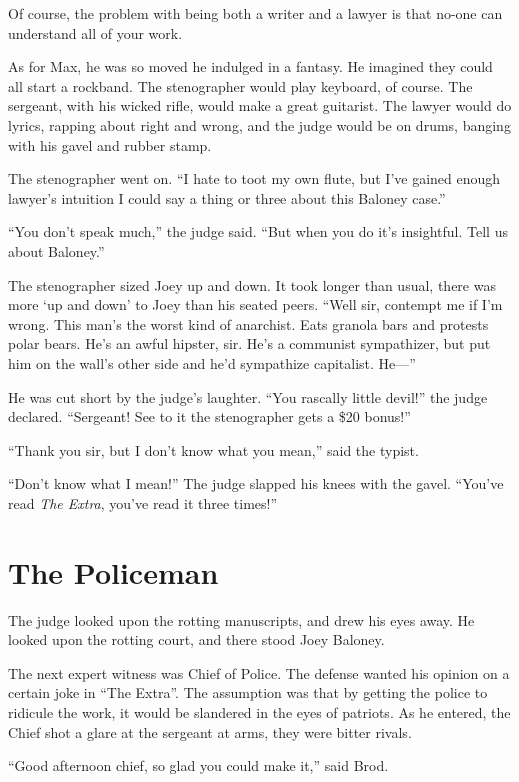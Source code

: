 \documentclass[oneside]{book}
\begin{document}
Of course, the problem with being both a writer and a lawyer is that no-one can
understand all of your work.

As for Max, he was so moved he indulged in a fantasy.
He imagined they could all start a rockband.
The stenographer would play keyboard, of course.
The sergeant, with his wicked rifle, would make a great guitarist.
The lawyer would do lyrics, rapping about right and wrong,
and the judge would be on drums, banging with his gavel and rubber stamp.

The stenographer went on.  ``I hate to toot my own flute, but I've gained enough
lawyer's intuition I could say a thing or three about this Baloney case.''

``You don't speak much,'' the judge said.  ``But when you do it's
insightful.  Tell us about Baloney.''

The stenographer sized Joey up and down.  It took longer
than usual, there was more `up and down' to Joey than his seated peers.
``Well sir, contempt me if I'm wrong.  This man's the worst kind of anarchist.
Eats granola bars and protests polar bears.  He's an awful hipster, sir.
He's a communist sympathizer, but put him on the wall's other side and he'd sympathize
capitalist.  He---''

He was cut short by the judge's laughter.  ``You rascally little devil!'' the judge
declared.  ``Sergeant!  See to it the stenographer gets a \$20 bonus!''

``Thank you sir, but I don't know what you mean,'' said the typist.

``Don't know what I mean!''  The judge slapped his knees with the gavel.  ``You've read \emph{The Extra},
you've read it three times!''


\chapter{The Policeman}


The judge looked upon the rotting manuscripts, and drew his eyes away.
He looked upon the rotting court, and there stood Joey Baloney.

The next expert witness was Chief of Police.  The defense wanted his opinion on a certain
joke in ``The Extra''.  The assumption was that by getting the police to ridicule the work,
it would be slandered in the eyes of patriots.  As he entered, the Chief
shot a glare at the sergeant at arms, they were bitter rivals.

``Good afternoon chief, so glad you could make it,'' said Brod.
\end{document}
